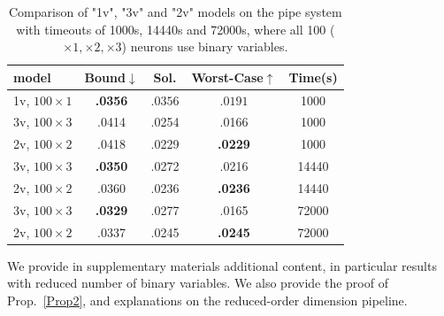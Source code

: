 		
	\begin{table}[h!]
	\begin{tabular}{||l||c|c|c|c||}\hline\hline
		model &        Bound$\downarrow$ &  Sol. &      Worst-Case$\uparrow$ &  Time(s) \\\hline \hline
		1v, $100 \times 1$ &     {\bf .0356} &  $.0356$ & $.0191$ &  1000 \\\hline
		3v, $100 \times 3$&     .0414 &  .0254 &  .0166 &  1000 \\\hline
		2v, $100 \times 2$&     .0418 &  .0229 &   {\bf .0229} &  1000 \\\hline \hline
		3v, $100 \times 3$&      {\bf .0350} &  .0272 &  .0216 & 14440 \\\hline
		2v, $100 \times 2$&     .0360 &  .0236 &    {\bf .0236} & 14440 \\\hline \hline
		3v, $100 \times 3$&     {\bf .0329} &  .0277 &  .0165 & 72000 \\\hline
		2v, $100 \times 2$&     .0337 &  .0245 &  {\bf .0245} & 72000 \\\hline\hline
	\end{tabular}
	\caption{Comparison of "1v", "3v" and "2v" models on the pipe system with timeouts of 1000s, 14440s and 72000s, where all 100 ($\times 1, \times 2,\times 3$) neurons use binary variables.}
	\label{table.pipe}
\end{table}

\newpage

 We provide in supplementary materials additional content, in particular results with reduced number of binary variables. We also provide the proof of Prop.~\ref{Prop2}, and explanations on the reduced-order dimension pipeline.